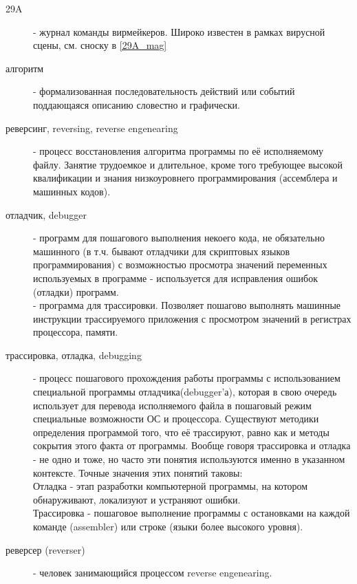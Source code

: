 \begin{description}
\item[29A]
 - журнал команды вирмейкеров. Широко известен в рамках вирусной сцены, см. сноску в \ref{29A_mag}

\item[алгоритм]
 - формализованная последовательность действий или событий поддающаяся описанию словестно и графически.

\item[реверсинг, reversing, reverse engenearing\label{reversing}]
 - процесс восстановления
 алгоритма программы по её исполняемому
файлу. Занятие трудоемкое и длительное, кроме того требующее высокой квалификации и знания
низкоуровнего программирования (ассемблера и машинных кодов).

\item[отладчик, debugger]
 - программ для пошагового выполнения некоего кода, не обязательно машинного (в т.ч. бывают отладчики
для скриптовых языков программирования) с возможностью просмотра значений переменных используемых в программе - используется для исправления ошибок (отладки) программ.\\
 - программа для трассировки. Позволяет пошагово выполнять машинные инструкции трассируемого
 приложения с просмотром значений в регистрах процессора, памяти.

\item[трассировка, отладка, debugging]
 - процесс пошагового прохождения работы программы с использованием
специальной программы отладчика(debugger'а), которая в свою очередь использует для перевода исполняемого
файла в пошаговый режим специальные возможности ОС и процессора. Существуют методики определения программой того, что её трассируют, равно как и методы сокрытия этого факта от программы. Вообще говоря трассировка и отладка - не одно и тоже, но часто эти понятия используются именно в указанном контексте.
Точные значения этих понятий таковы:\\
Отладка - этап разработки компьютерной программы, на котором обнаруживают, локализуют и устраняют ошибки.\\
Трассировка - пошаговое выполнение программы с остановками на каждой команде (assembler) или строке (языки более высокого уровня).

\item[реверсер (reverser)\label{reverser}]
 - человек занимающийся процессом reverse engenearing.


\end{description}
